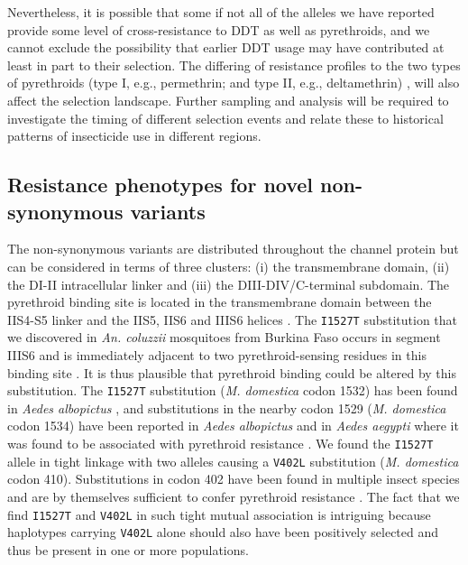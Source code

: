 \documentclass[a4paper,11pt,abstracton,hidelinks]{scrartcl}
\begin{document}
%
Nevertheless, it is possible that some if not all of the alleles we have reported provide some level of cross-resistance to DDT as well as pyrethroids, and we cannot exclude the possibility that earlier DDT usage may have contributed at least in part to their selection.
%
The differing of resistance profiles to the two types of pyrethroids (type I, e.g., permethrin; and type II, e.g., deltamethrin) \cite{Hu2011}, will also affect the selection landscape.
%
Further sampling and analysis will be required to investigate the timing of different selection events and relate these to historical patterns of insecticide use in different regions.


\subsection*{Resistance phenotypes for novel non-synonymous variants}

%
The non-synonymous variants are distributed throughout the channel protein but can be considered in terms of three clusters: (i) the transmembrane domain, (ii) the DI-II intracellular linker and (iii) the DIII-DIV/C-terminal subdomain. 
%
The pyrethroid binding site is located in the transmembrane domain between the IIS4-S5 linker and the IIS5, IIS6 and IIIS6 helices \cite{OReilly2006}. 
%
The \texttt{I1527T} substitution that we discovered in \textit{An. coluzzii} mosquitoes from Burkina Faso occurs in segment IIIS6 and is immediately adjacent to two pyrethroid-sensing residues in this binding site \cite{Dong2014}.
%
It is thus plausible that pyrethroid binding could be altered by this substitution.
%
The \texttt{I1527T} substitution (\textit{M. domestica} codon 1532) has been found in \textit{Aedes albopictus} \cite{Xu2016}, and substitutions in the nearby codon 1529 (\textit{M. domestica} codon 1534) have been reported in \textit{Aedes albopictus} and in \textit{Aedes aegypti} where it was found to be associated with pyrethroid resistance \cite{Dong2014, Ishak2015,Li2018}.
%
We found the \texttt{I1527T} allele in tight linkage with two alleles causing a \texttt{V402L} substitution (\textit{M. domestica} codon 410).
%
Substitutions in codon 402 have been found in multiple insect species and are by themselves sufficient to confer pyrethroid resistance \cite{Dong2014}.
%
The fact that we find \texttt{I1527T} and \texttt{V402L} in such tight mutual association is intriguing because haplotypes carrying \texttt{V402L} alone should also have been positively selected and thus be present in one or more populations.
%
\end{document}
